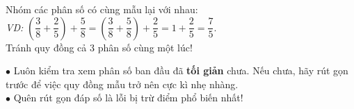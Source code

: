 \documentclass[14pt,a4paper,oneside]{extbook}
\begin{document}
\noindent
\begin{minipage}[t]{0.54\textwidth}
  \begin{tcolorbox}[
    enhanced,
    title={\footnotesize\bfseries\color{white}\faBolt\ Tính chất phân phối và nhóm số hạng},
    colback=green!3!white,
    colframe=green!60!black,
    arc=2.5mm, boxrule=0.8pt, top=1.8mm, bottom=1.8mm, left=2.2mm, right=2.2mm
  ]
    \footnotesize
    Nhóm các phân số có cùng mẫu lại với nhau:\\
    \textit{VD:} $\left(\dfrac{3}{8} + \dfrac{2}{5}\right) + \dfrac{5}{8} = \left(\dfrac{3}{8} + \dfrac{5}{8}\right) + \dfrac{2}{5} = 1 + \dfrac{2}{5} = \dfrac{7}{5}$.\\
    Tránh quy đồng cả 3 phân số cùng một lúc!
  \end{tcolorbox}
\end{minipage}%
\hfill
\begin{minipage}[t]{0.44\textwidth}
  \begin{tcolorbox}[
    enhanced,
    title={\footnotesize\bfseries\color{white}\faExclamationTriangle\ Mẹo tránh bẫy trắc nghiệm},
    colback=red!2!white,
    colframe=red!70!black,
    arc=2.5mm, boxrule=0.8pt, top=1.8mm, bottom=1.8mm, left=2.2mm, right=2.2mm
  ]
    \footnotesize
    $\bullet$ Luôn kiểm tra xem phân số ban đầu đã \textbf{tối giản} chưa. Nếu chưa, hãy rút gọn trước để việc quy đồng mẫu trở nên cực kì nhẹ nhàng.\\
    $\bullet$ Quên rút gọn đáp số là lỗi bị trừ điểm phổ biến nhất!
  \end{tcolorbox}
\end{minipage}
\end{document}
